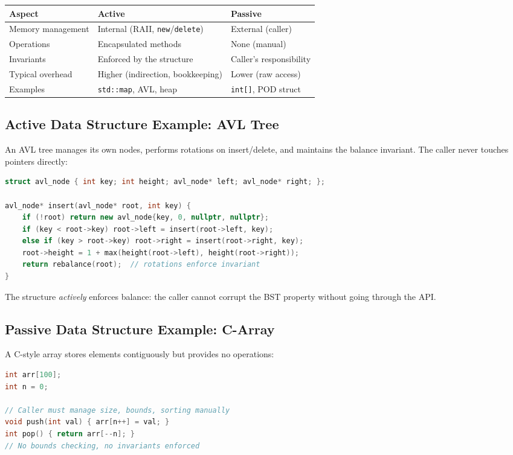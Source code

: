 \begin{center}
\begin{tabular}{lll}
\toprule
Aspect & Active & Passive \\
\midrule
Memory management & Internal (RAII, \texttt{new}/\texttt{delete}) & External (caller) \\
Operations & Encapsulated methods & None (manual) \\
Invariants & Enforced by the structure & Caller's responsibility \\
Typical overhead & Higher (indirection, bookkeeping) & Lower (raw access) \\
Examples & \texttt{std::map}, AVL, heap & \texttt{int[]}, POD struct \\
\bottomrule
\end{tabular}
\end{center}

\subsection{Active Data Structure Example: AVL Tree}

An AVL tree manages its own nodes, performs rotations on insert/delete, and maintains the balance invariant. The caller never touches pointers directly:

\begin{lstlisting}[language=C++]
struct avl_node { int key; int height; avl_node* left; avl_node* right; };

avl_node* insert(avl_node* root, int key) {
    if (!root) return new avl_node{key, 0, nullptr, nullptr};
    if (key < root->key) root->left = insert(root->left, key);
    else if (key > root->key) root->right = insert(root->right, key);
    root->height = 1 + max(height(root->left), height(root->right));
    return rebalance(root);  // rotations enforce invariant
}
\end{lstlisting}

The structure \emph{actively} enforces balance: the caller cannot corrupt the BST property without going through the API.

\subsection{Passive Data Structure Example: C-Array}

A C-style array stores elements contiguously but provides no operations:

\begin{lstlisting}[language=C++]
int arr[100];
int n = 0;

// Caller must manage size, bounds, sorting manually
void push(int val) { arr[n++] = val; }
int pop() { return arr[--n]; }
// No bounds checking, no invariants enforced
\end{lstlisting}

